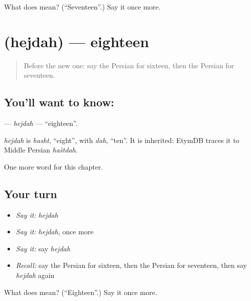 \begin{tcolorbox}[breakable,colback=teal!4,colframe=teal!35!black,title={Before you move on}]
What does  mean? (\textquotedblleft{}Seventeen\textquotedblright{}.) Say it once more.
\end{tcolorbox}
\section[\texorpdfstring{\fa{هجده} (hejdah)}{هجده (hejdah)}]{ (hejdah) — eighteen}

\label{lesson:FA-C76-hejdah}



\begin{quote}
Before the new one: say the Persian for sixteen, then the Persian for seventeen.
\end{quote}

\subsection*{You'll want to know: }
\textbf{} — \emph{hejdah} — \textquotedblleft{}eighteen\textquotedblright{}.

\begin{cousinweb}
\emph{hejdah} is \emph{hasht}, \textquotedblleft{}eight\textquotedblright{}, with \emph{dah}, \textquotedblleft{}ten\textquotedblright{}. It is inherited: EtymDB traces it to Middle Persian \emph{haštdah}.
\end{cousinweb}

\begin{grammarlens}[title={What you've built}]
One more word for this chapter.
\end{grammarlens}

\subsection*{Your turn}
\begin{itemize}
\raggedright
  \item \emph{Say it:} \emph{hejdah}
  \item \emph{Say it:} \emph{hejdah}, once more
  \item \emph{Say it:} say \emph{hejdah}
  \item \emph{Recall:} say the Persian for sixteen, then the Persian for seventeen, then say \emph{hejdah} again
\end{itemize}

\begin{tcolorbox}[breakable,colback=teal!4,colframe=teal!35!black,title={Before you move on}]
What does  mean? (\textquotedblleft{}Eighteen\textquotedblright{}.) Say it once more.
\end{tcolorbox}
